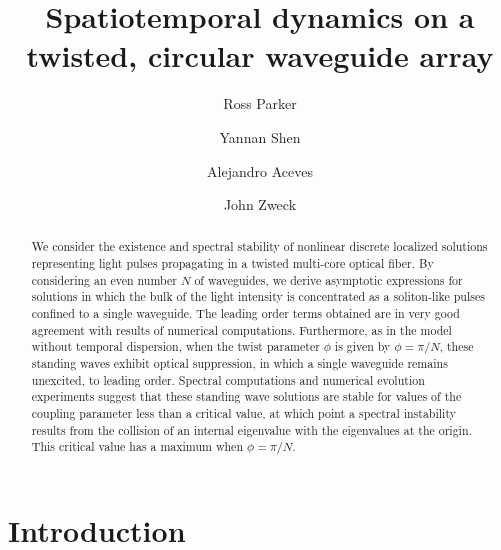 \documentclass[11pt,reqno]{amsart}
\begin{document}
\title{Spatiotemporal dynamics on a twisted, circular waveguide array}

\author{Ross Parker}
\address{Department of Mathematics, Southern Methodist University, 
Dallas, TX 75275, USA}

\author{Yannan Shen} 
\address{Department of Mathematics, University of Kansas, Lawrence, KS 66045, USA}

\author{Alejandro Aceves}
\address{Department of Mathematics, Southern Methodist University, 
Dallas, TX 75275, USA}

\author{John Zweck}
\address{Department of Mathematics, The University of Texas at Dallas, 
Richardson, TX 75080, USA}

\begin{abstract}
We consider the existence and spectral stability of nonlinear discrete localized solutions representing light pulses propagating in a twisted multi-core optical fiber. By considering an even number $N$ of waveguides, we derive asymptotic expressions for solutions in which the bulk of the light intensity is concentrated as a soliton-like pulses confined to a single waveguide. The leading order terms obtained are in very good agreement with results of numerical computations. Furthermore, as in the model without temporal dispersion, when the twist parameter $\phi$ is given by $\phi = \pi/N$, these standing waves exhibit optical suppression, in which a single waveguide remains unexcited, to leading order. Spectral computations and numerical evolution experiments suggest that these standing wave solutions are stable for values of the coupling parameter less than a critical value, at which point a spectral instability results from the collision of an internal eigenvalue with the eigenvalues at the origin. This critical value has a maximum when $\phi = \pi/N$.
\end{abstract}

\maketitle

\section{Introduction}
\end{document}
